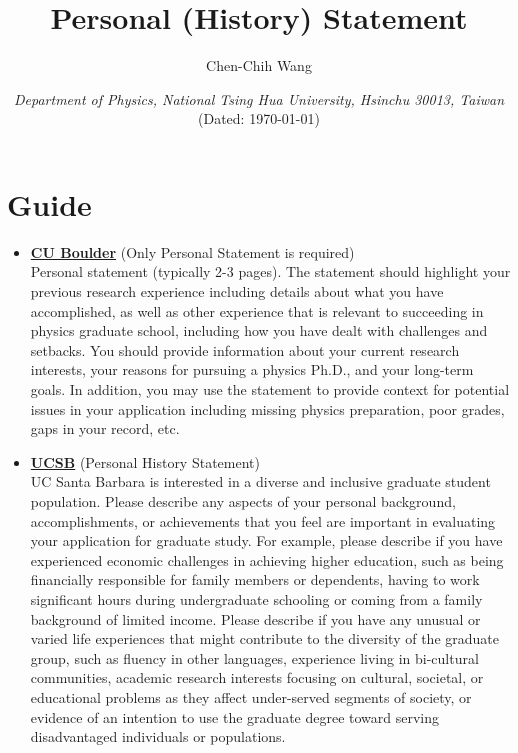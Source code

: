 \documentclass[12font]{article}
\title{\textbf{Personal (History) Statement}}
\author{Chen-Chih Wang  }
\date{\textit{Department of Physics, National Tsing Hua University, Hsinchu 30013, Taiwan} \\ (Dated: \today)}
\numberwithin{equation}{section}    %
\begin{document}
\maketitle
\renewcommand\qedsymbol{$\blacksquare$}



\fontsize{12pt}{16pt}\selectfont

\section*{Guide}
{\color{violet}
\begin{itemize}
    \item \textbf{\underline{CU Boulder}} (Only Personal Statement is required)   \\
        Personal statement (typically 2-3 pages). The statement should highlight your previous research experience including details about what you have accomplished, as well as other experience that is relevant to succeeding in physics graduate school, including how you have dealt with challenges and setbacks. You should provide information about your current research interests, your reasons for pursuing a physics Ph.D., and your long-term goals. In addition, you may use the statement to provide context for potential issues in your application including missing physics preparation, poor grades, gaps in your record, etc. 
    \item \textbf{\underline{UCSB}} (Personal History Statement) \\
        UC Santa Barbara is interested in a diverse and inclusive graduate student population. Please describe any aspects of your personal background, accomplishments, or achievements that you feel are important in evaluating your application for graduate study. For example, please describe if you have experienced economic challenges in achieving higher education, such as being financially responsible for family members or dependents, having to work significant hours during undergraduate schooling or coming from a family background of limited income. Please describe if you have any unusual or varied life experiences that might contribute to the diversity of the graduate group, such as fluency in other languages, experience living in bi-cultural communities, academic research interests focusing on cultural, societal, or educational problems as they affect under-served segments of society, or evidence of an intention to use the graduate degree toward serving disadvantaged individuals or populations.


\end{itemize}}
\end{document}
